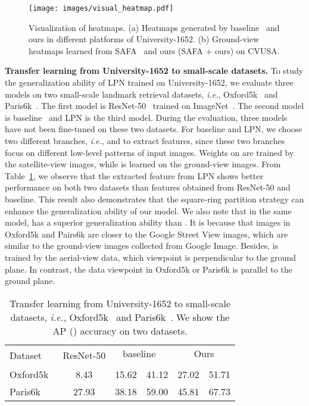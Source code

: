\documentclass[journal]{IEEEtran}
\def\ie{\emph{i.e.}}
\begin{document}
\begin{figure}[htp]
  \centering
  \texttt{[image: images/visual\_heatmap.pdf]}
  \caption{
  Visualization of heatmaps. (a) Heatmaps generated by baseline~\cite{zheng_university-1652_nodate} and ours in different platforms of University-1652. (b) Ground-view heatmaps learned from SAFA~\cite{shi_spatial-aware_nodate} and ours (SAFA + ours) on CVUSA. 
  }
  \label{fig:visual_heatmap}
\end{figure}
\textbf{Transfer learning from University-1652 to small-scale datasets.} 
To study the generalization ability of LPN trained on University-1652, we evaluate three models on two small-scale landmark retrieval datasets, \ie, Oxford5k~\cite{philbin2007object} and Paris6k~\cite{philbin2008lost}. The first model is ResNet-50~\cite{he2016deep} trained on ImageNet~\cite{5206848}. The second model is baseline~\cite{zheng_university-1652_nodate} and LPN is the third model. During the evaluation, three models have not been fine-tuned on these two datasets. For baseline and LPN, we choose two different branches, \ie,  and  to extract features, since these two branches focus on different low-level patterns of input images. Weights on  are trained by the satellite-view images, while  is learned on the ground-view images. From Table~\ref{table:transfer}, we observe that the extracted feature from LPN shows better performance on both two datasets than features obtained from ResNet-50 and baseline. This result also demonstrates that the square-ring partition strategy can enhance the generalization ability of our model.
We also note that in the same model,  has a superior generalization ability than . It is because that images in Oxford5k and Pairs6k are closer to the Google Street View images, which are similar to the ground-view images collected from Google Image. Besides,  is trained by the aerial-view data, which viewpoint is perpendicular to the ground plane. In contrast, the data viewpoint in Oxford5k or Paris6k is parallel to the ground plane.

\setlength{\tabcolsep}{6pt}
\begin{table}
\small
\caption{Transfer learning from University-1652 to small-scale datasets, \ie, Oxford5k~\cite{philbin2007object} and Paris6k~\cite{philbin2008lost}. We show the AP () accuracy on two datasets.
}
\begin{center}
\begin{tabular}{l|c|cc|cc}
\hline
\multirow{2}{*}{Dataset} & \multirow{2}{*}{ResNet-50} & \multicolumn{2}{c|}{baseline~\cite{zheng_university-1652_nodate}} & \multicolumn{2}{c}{Ours}\\
\cline{3-6}  & &  &  &  & \\
\shline
Oxford5k~\cite{philbin2007object} & 8.43 & 15.62 & 41.12 & 27.02 & 51.71 \\  
Paris6k~\cite{philbin2008lost} & 27.93 & 38.18 & 59.00 & 45.81 & 67.73 \\ 

\hline
\end{tabular}
\end{center}
\label{table:transfer}
\end{table}
\end{document}
